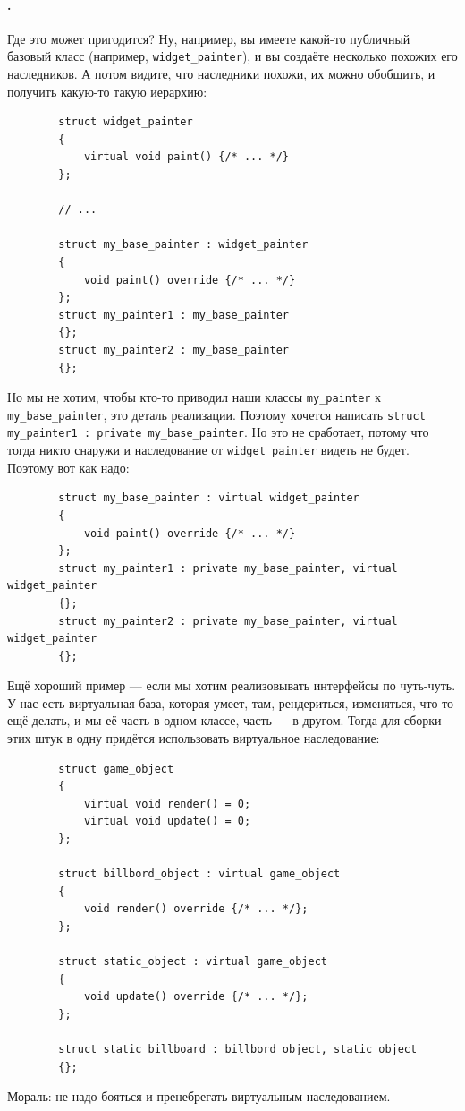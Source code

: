 \documentclass{article}
\begin{document}
    \paragraph{.}
    Где это может пригодится? Ну, например, вы имеете какой-то публичный базовый класс (например, \texttt{widget_painter}), и вы создаёте несколько похожих его наследников. А потом видите, что наследники похожи, их можно обобщить, и получить какую-то такую иерархию:
    \begin{verbatim}
        struct widget_painter
        {
            virtual void paint() {/* ... */}
        };

        // ...

        struct my_base_painter : widget_painter
        {
            void paint() override {/* ... */}
        };
        struct my_painter1 : my_base_painter
        {};
        struct my_painter2 : my_base_painter
        {};
    \end{verbatim}
    Но мы не хотим, чтобы кто-то приводил наши классы \texttt{my_painter} к \texttt{my_base_painter}, это деталь реализации. Поэтому хочется написать \texttt{struct my_painter1 : private my_base_painter}. Но это не сработает, потому что тогда никто снаружи и наследование от \texttt{widget_painter} видеть не будет. Поэтому вот как надо:
    \begin{verbatim}
        struct my_base_painter : virtual widget_painter
        {
            void paint() override {/* ... */}
        };
        struct my_painter1 : private my_base_painter, virtual widget_painter
        {};
        struct my_painter2 : private my_base_painter, virtual widget_painter
        {};
    \end{verbatim}
    Ещё хороший пример --- если мы хотим реализовывать интерфейсы по чуть-чуть. У нас есть виртуальная база, которая умеет, там, рендериться, изменяться, что-то ещё делать, и мы её часть в одном классе, часть --- в другом. Тогда для сборки этих штук в одну придётся использовать виртуальное наследование:
    \begin{verbatim}
        struct game_object
        {
            virtual void render() = 0;
            virtual void update() = 0;
        };

        struct billbord_object : virtual game_object
        {
            void render() override {/* ... */};
        };

        struct static_object : virtual game_object
        {
            void update() override {/* ... */};
        };

        struct static_billboard : billbord_object, static_object
        {};
    \end{verbatim}
    Мораль: не надо бояться и пренебрегать виртуальным наследованием.
\end{document}
